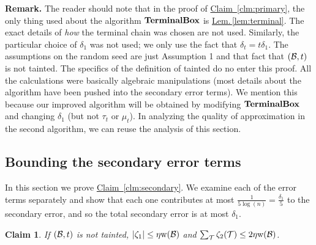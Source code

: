\documentclass{acmsmall}
\newtheorem{claim}[theorem]{Claim}
\newcommand{\cB}{{\cal B}}
\newcommand{\cT}{{\cal T}}
\newcommand{\Thm}[1]{\hyperref[thm:#1]{Thm.\,\ref*{thm:#1}}} %
\newcommand{\Lem}[1]{\hyperref[lem:#1]{Lem.\,\ref*{lem:#1}}} %
\newcommand{\Clm}[1]{\hyperref[clm:#1]{Claim~\ref*{clm:#1}}} %
\newcommand{\terminalbox}{{\rm{\bf TerminalBox}}}
\newcommand{\taint}{\eta}
\newcommand{\width}{{\bf {\rm  w}}}
\newcommand{\errorterm}{\zeta}
\begin{document}
{\bf Remark.} The reader should note that in the proof of \Clm{primary}, 
the only thing used about the algorithm $\terminalbox$ is \Lem{terminal}. The
exact details of \emph{how} the terminal chain was chosen are not used. Similarly, the particular choice of $\delta_1$ was
not used; we only use the fact that $\delta_t = t\delta_1$. 
The assumptions on the random seed are just Assumption 1 and that fact that $(\cB,t)$ is not tainted.
The specifics of the definition of tainted do no enter this proof.
All the calculations were basically algebraic manipulations (most details about the algorithm
have been pushed into the secondary error terms).
We mention this because our improved algorithm 
will be obtained by modifying $\terminalbox$ and changing $\delta_1$ (but not $\tau_t$ or $\mu_t$).
In analyzing the quality of approximation in the second
algorithm, we can reuse the analysis of this section.
% 
%
%
%
\subsection{Bounding the secondary error terms}
\label{subsec:secondary analysis}

In this section we prove \Clm{secondary}.
We examine each of the error terms separately and show that each one contributes at most $\frac{1}{5\log(n)}=\frac{\delta_1}{5}$ to the secondary error, and so the total secondary error is at most $\delta_1$.


\begin{claim}
\label{clm:et1+et2}
If  $(\cB,t)$ is not tainted, $|\errorterm_1| \leq \taint\width(\cB)$ and $\sum_\cT \errorterm_2(\cT) \leq 2\taint \width(\cB)$.
\end{claim}
\end{document}
